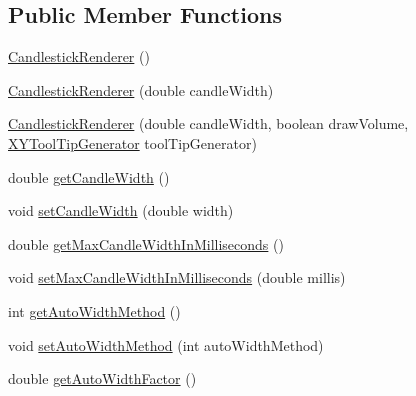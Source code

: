 \subsection*{Public Member Functions}
\begin{DoxyCompactItemize}
\item 
\mbox{\hyperlink{classorg_1_1jfree_1_1chart_1_1renderer_1_1xy_1_1_candlestick_renderer_a37029c94803a2bf1a6272953d994ce72}{Candlestick\+Renderer}} ()
\item 
\mbox{\hyperlink{classorg_1_1jfree_1_1chart_1_1renderer_1_1xy_1_1_candlestick_renderer_a3a137b99098123b9c8cb0ce2fcecf106}{Candlestick\+Renderer}} (double candle\+Width)
\item 
\mbox{\hyperlink{classorg_1_1jfree_1_1chart_1_1renderer_1_1xy_1_1_candlestick_renderer_a7ea6863030ee8065a98c59f9606b9e0c}{Candlestick\+Renderer}} (double candle\+Width, boolean draw\+Volume, \mbox{\hyperlink{interfaceorg_1_1jfree_1_1chart_1_1labels_1_1_x_y_tool_tip_generator}{X\+Y\+Tool\+Tip\+Generator}} tool\+Tip\+Generator)
\item 
double \mbox{\hyperlink{classorg_1_1jfree_1_1chart_1_1renderer_1_1xy_1_1_candlestick_renderer_a8e2e6f4753add10d08fb407e21de08cf}{get\+Candle\+Width}} ()
\item 
void \mbox{\hyperlink{classorg_1_1jfree_1_1chart_1_1renderer_1_1xy_1_1_candlestick_renderer_a212b98d88bbc173df25fcafd7f983ff3}{set\+Candle\+Width}} (double width)
\item 
double \mbox{\hyperlink{classorg_1_1jfree_1_1chart_1_1renderer_1_1xy_1_1_candlestick_renderer_a6c06bc6b4e7471616cd59579e342ddb8}{get\+Max\+Candle\+Width\+In\+Milliseconds}} ()
\item 
void \mbox{\hyperlink{classorg_1_1jfree_1_1chart_1_1renderer_1_1xy_1_1_candlestick_renderer_a7f28bced2a25bf012d05127ac175af49}{set\+Max\+Candle\+Width\+In\+Milliseconds}} (double millis)
\item 
int \mbox{\hyperlink{classorg_1_1jfree_1_1chart_1_1renderer_1_1xy_1_1_candlestick_renderer_aeb7c08c7e6bbdbfe7b1ef2ddbcf0ac34}{get\+Auto\+Width\+Method}} ()
\item 
void \mbox{\hyperlink{classorg_1_1jfree_1_1chart_1_1renderer_1_1xy_1_1_candlestick_renderer_a556f4cc791dcf82be3e4e82c6f82dd66}{set\+Auto\+Width\+Method}} (int auto\+Width\+Method)
\item 
double \mbox{\hyperlink{classorg_1_1jfree_1_1chart_1_1renderer_1_1xy_1_1_candlestick_renderer_ac7b617c9739390cf4e97dfb42d0845d0}{get\+Auto\+Width\+Factor}} ()
\item 

\end{DoxyCompactItemize}
